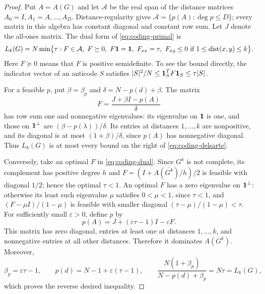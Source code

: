 \documentclass[10pt,a4paper]{article}
\theoremstyle{plain}
\numberwithin{equation}{section}
\DeclareMathOperator{\dist}{dist}
\def\1{\mbox{\boldmath $1$}}
\begin{document}
\begin{proof}
Put $A=A(G)$ and let $\mathcal A$ be the real span of the distance
matrices $A_0=I,A_1=A,\ldots,A_D$. Distance-regularity gives
$\mathcal A=\{p(A):\deg p\le D\}$; every matrix in this algebra has constant diagonal and constant row sum. Let $J$ denote the all-ones matrix. The dual form of \eqref{eq:coding-primal} is
\begin{equation}\label{eq:coding-dual}
 L_k(G)=N\min\bigl\{\tau:
 F\in\mathcal A,\ F\succeq0,\ F\1=\1,\ F_{xx}=\tau,
 \ F_{xy}\le0\ \text{if }1\le\dist(x,y)\le k\bigr\}.
\end{equation}
Here $F\succeq0$ means that $F$ is positive semidefinite. To see the
bound directly, the indicator vector of an anticode $S$ satisfies
$|S|^2/N\le\1_S^T F\1_S\le\tau|S|$.

For a feasible $p$, put $\beta=\beta_p$ and
$\delta=N-p(d)+\beta$. The matrix
\[
 F=\frac{J+\beta I-p(A)}{\delta}
\]
has row sum one and nonnegative eigenvalues: its eigenvalue on $\1$ is one, and those on $\1^\perp$ are $(\beta-p(\lambda))/\delta$. Its entries at distances $1,\ldots,k$ are nonpositive, and its diagonal is at most $(1+\beta)/\delta$, since $p(A)$ has nonnegative diagonal. Thus $L_k(G)$ is at most every bound on the right of
\eqref{eq:coding-delsarte}.

Conversely, take an optimal $F$ in \eqref{eq:coding-dual}.
Since $G^k$ is not complete, its complement has positive degree $h$ and $F=(I+A(\overline{G^k})/h)/2$ is feasible with diagonal $1/2$; hence the optimal $\tau<1$.
An optimal $F$ has a zero eigenvalue on $\1^\perp$: otherwise its least
such eigenvalue $\mu$ satisfies $0<\mu<1$, since $\tau<1$, and
$(F-\mu I)/(1-\mu)$ is feasible with smaller diagonal
$(\tau-\mu)/(1-\mu)<\tau$.
For sufficiently small $\varepsilon>0$, define $p$ by
\[
 p(A)=J+(\varepsilon\tau-1)I-\varepsilon F.
\]
This matrix has zero diagonal, entries at least one at distances
$1,\ldots,k$, and nonnegative entries at all other distances. Therefore it dominates $A(G^k)$. Moreover,
\[
 \beta_p=\varepsilon\tau-1,\qquad
 p(d)=N-1+\varepsilon(\tau-1),\qquad
 \frac{N(1+\beta_p)}{N-p(d)+\beta_p}=N\tau=L_k(G),
\]
which proves the reverse desired inequality.
\end{proof}
\end{document}
